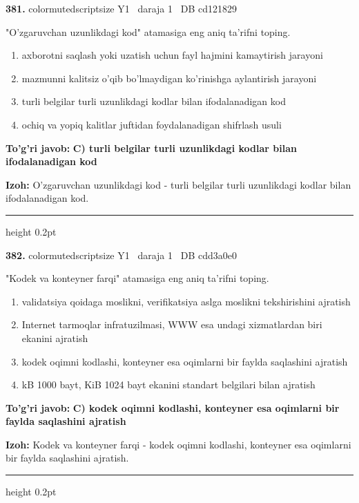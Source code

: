 \documentclass[10pt,a4paper,oneside]{article}
\begin{document}
\noindent\textbf{\color{ink}381.}  {color{muted}scriptsize Y1 \textbullet\ daraja 1 \textbullet\ DB cd121829}
\par
"O'zgaruvchan uzunlikdagi kod" atamasiga eng aniq ta'rifni toping.
\begin{enumerate}[label=\Alph*),leftmargin=9mm]
\item axborotni saqlash yoki uzatish uchun fayl hajmini kamaytirish jarayoni
\item mazmunni kalitsiz o'qib bo'lmaydigan ko'rinishga aylantirish jarayoni
\item turli belgilar turli uzunlikdagi kodlar bilan ifodalanadigan kod
\item ochiq va yopiq kalitlar juftidan foydalanadigan shifrlash usuli
\end{enumerate}
\begin{tcolorbox}[enhanced,breakable,colback=teal!4,colframe=teal!50!black,boxrule=0.5pt,arc=1.1mm,left=3mm,right=3mm,top=1.7mm,bottom=1.7mm,before skip=2mm,after skip=2mm]
\textbf{\color{teal}To'g'ri javob:} \textbf{C) turli belgilar turli uzunlikdagi kodlar bilan ifodalanadigan kod}
\par\smallskip
\textbf{Izoh:} O'zgaruvchan uzunlikdagi kod - turli belgilar turli uzunlikdagi kodlar bilan ifodalanadigan kod.
\end{tcolorbox}
\vspace{2mm}\hrule height 0.2pt \vspace{3mm}

\noindent\textbf{\color{ink}382.}  {color{muted}scriptsize Y1 \textbullet\ daraja 1 \textbullet\ DB cdd3a0e0}
\par
"Kodek va konteyner farqi" atamasiga eng aniq ta'rifni toping.
\begin{enumerate}[label=\Alph*),leftmargin=9mm]
\item validatsiya qoidaga moslikni, verifikatsiya aslga moslikni tekshirishini ajratish
\item Internet tarmoqlar infratuzilmasi, WWW esa undagi xizmatlardan biri ekanini ajratish
\item kodek oqimni kodlashi, konteyner esa oqimlarni bir faylda saqlashini ajratish
\item kB 1000 bayt, KiB 1024 bayt ekanini standart belgilari bilan ajratish
\end{enumerate}
\begin{tcolorbox}[enhanced,breakable,colback=teal!4,colframe=teal!50!black,boxrule=0.5pt,arc=1.1mm,left=3mm,right=3mm,top=1.7mm,bottom=1.7mm,before skip=2mm,after skip=2mm]
\textbf{\color{teal}To'g'ri javob:} \textbf{C) kodek oqimni kodlashi, konteyner esa oqimlarni bir faylda saqlashini ajratish}
\par\smallskip
\textbf{Izoh:} Kodek va konteyner farqi - kodek oqimni kodlashi, konteyner esa oqimlarni bir faylda saqlashini ajratish.
\end{tcolorbox}
\vspace{2mm}\hrule height 0.2pt \vspace{3mm}
\end{document}
